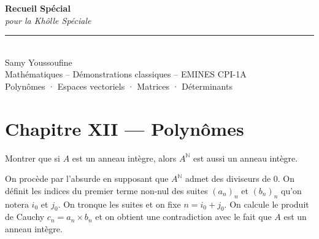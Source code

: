 \documentclass[11pt, a4paper]{article}
\theoremstyle{definition}
\begin{document}
\begin{titlepage}
  \centering
  \vspace*{3cm}
  {\Huge\bfseries Recueil Spécial}\\[0.6em]
  {\Large\itshape pour la Khôlle Spéciale}\\[3cm]
  \rule{0.5\linewidth}{0.4pt}\\[2em]
  {\Large Samy Youssoufine}\\[2em]
  {\large Mathématiques -- Démonstrations classiques -- EMINES CPI-1A}\\[0.4em]
  {\normalsize\color{gray} Polynômes · Espaces vectoriels · Matrices · Déterminants}
  \vfill
\end{titlepage}

\tableofcontents

\thispagestyle{empty}
\clearpage

\section{Chapitre XII --- Polynômes}

\begin{tcolorbox}[instructionstyle]
Montrer que si $A$ est un anneau intègre, alors $A^\mathbb N$ est aussi un anneau intègre.
\end{tcolorbox}

\begin{tcolorbox}[methodstyle]
  On procède par l'absurde en supposant que $A^\mathbb N$ admet des diviseurs de 0. On définit les indices du premier terme non-nul des suites $(a_n)_n$ et $(b_n)_n$ qu'on notera $i_0$ et $j_0$. On tronque les suites et on fixe $n = i_0 + j_0$. On calcule le produit de Cauchy $c_n = a_n \times b_n$ et on obtient une contradiction avec le fait que $A$ est un anneau intègre.
\end{tcolorbox}
\end{document}
